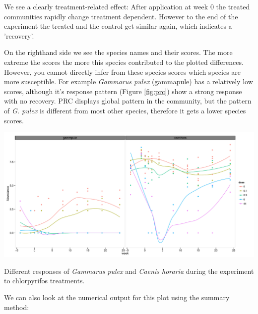\documentclass{tufte-book}\usepackage{knitr}
\begin{document}
We see a clearly treatment-related effect: After application at week 0 the 
treated communities rapidly change treatment dependent. However to the end of 
the experiment the treated and the control get similar again, which indicates a 
'recovery'.

On the righthand side we see the species names and their scores. The more 
extreme the scores the more this species contributed to the plotted differences. 
However, you cannot directly infer from these species scores which species are more
susceptible. For example \textit{Gammarus pulex} (gammapule) has a relatively 
low scores, although it's response pattern (Figure \ref{fig:prc}) show a strong
response with no recovery. PRC displays global pattern in the community, but the 
pattern of \textit{G. pulex} is different from most other species, therefore it 
gets a lower species scores.

\begin{marginfigure}
\begin{knitrout}
\color{fgcolor}

{\centering \includegraphics[width=\maxwidth]{graphics/pyrifos_gammarus} 

}



\end{knitrout}

\caption{Different responses of \textit{Gammarus pulex} and \textit{Caenis horaria} during 
the experiment to chlorpyrifos treatments.}
\label{fig:prc}
\end{marginfigure}


We can also look at the numerical output for this plot using the summary method:
\begin{knitrout}
\color{fgcolor}\begin{kframe}
\begin{alltt}
\end{alltt}
\end{kframe}
\end{knitrout}
\end{document}
